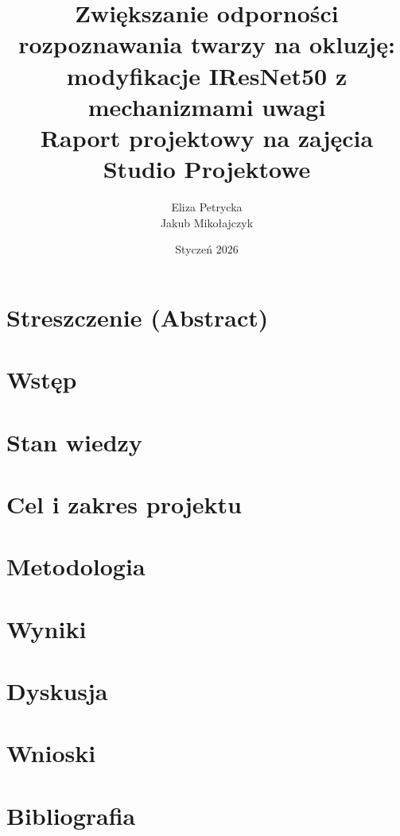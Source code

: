 \documentclass{article}
\title{Zwiększanie odporności rozpoznawania twarzy na okluzję: \\ modyfikacje IResNet50 z mechanizmami uwagi \\
\large Raport projektowy na zajęcia\\
\large Studio Projektowe}
\author{Eliza Petrycka \\ Jakub Mikołajczyk}
\date{Styczeń 2026}
\begin{document}
\maketitle
\newpage

\section{Streszczenie (Abstract)}


\section{Wstęp}


\section{Stan wiedzy}


\section{Cel i zakres projektu}



\section{Metodologia}


\section{Wyniki}


\section{Dyskusja}


\section{Wnioski}


\section{Bibliografia}

\newpage

\end{document}
